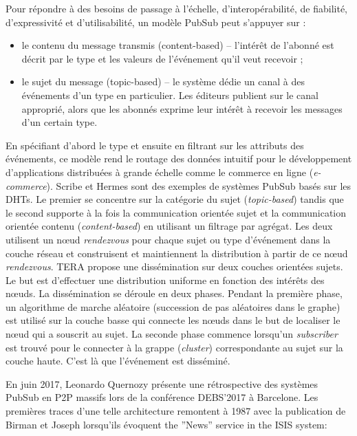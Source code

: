 Pour répondre à des besoins de passage à l'échelle, d'interopérabilité, de fiabilité, 
d'expressivité et d'utilisabilité, un modèle \gls{PubSub} peut s'appuyer sur :
\begin{itemize}
\item
 le contenu du message transmis (content-based)  -- l'intérêt de l'abonné est décrit par le type et les valeurs de l'événement qu'il veut recevoir ;
\item le sujet du message (topic-based) -- le système dédie un canal à des événements d'un type en particulier. Les éditeurs publient sur le canal approprié, alors que les abonnés exprime leur intérêt à recevoir les messages d'un certain type.  
\end{itemize}
En spécifiant d'abord le type et ensuite en filtrant sur les attributs des 
événements, ce modèle rend le routage des données intuitif pour le 
développement d'applications distribuées à grande échelle comme le commerce en 
ligne (\textit{e-commerce}). 
Scribe \cite{Castro2002} et Hermes \cite{Pietzuch2002} sont des exemples de 
systèmes \gls{PubSub} basés sur les \glspl{DHT}. 
Le premier se concentre sur la catégorie du sujet (\textit{topic-based}) tandis que le second 
supporte à la fois la communication orientée sujet et la communication orientée contenu (\textit{content-based}) en utilisant un 
filtrage par agrégat. Les deux utilisent un n\oe ud \textit{rendezvous} pour chaque 
sujet ou type d'événement dans la couche réseau et construisent et maintiennent la 
distribution à partir de ce n\oe ud \textit{rendezvous}. TERA \cite{Baldoni2007} 
propose une dissémination sur deux couches orientées sujets. Le but est d'effectuer 
une distribution uniforme en fonction des intérêts des n\oe uds. La dissémination 
se déroule en deux phases. Pendant la première phase, un algorithme de marche aléatoire (succession de pas aléatoires dans le graphe)
est utilisé sur la couche basse qui connecte les n\oe uds dans le but de localiser 
le n\oe ud qui a souscrit au sujet. La seconde phase commence lorsqu'un 
\textit{subscriber} est trouvé pour le connecter à la grappe (\textit{cluster}) correspondante au 
sujet  sur la couche haute. C'est là que l'événement est disséminé.

En juin 2017, Leonardo Quernozy présente une rétrospective des systèmes 
\gls{PubSub} en \gls{P2P} massifs lors de la conférence DEBS'2017 à 
Barcelone. 
Les premières traces d'une telle architecture remontent à 1987 avec 
la publication de Birman et Joseph \cite{Birman1987} lorsqu'ils évoquent \og 
the ''News'' service in the ISIS system\fg{}:

